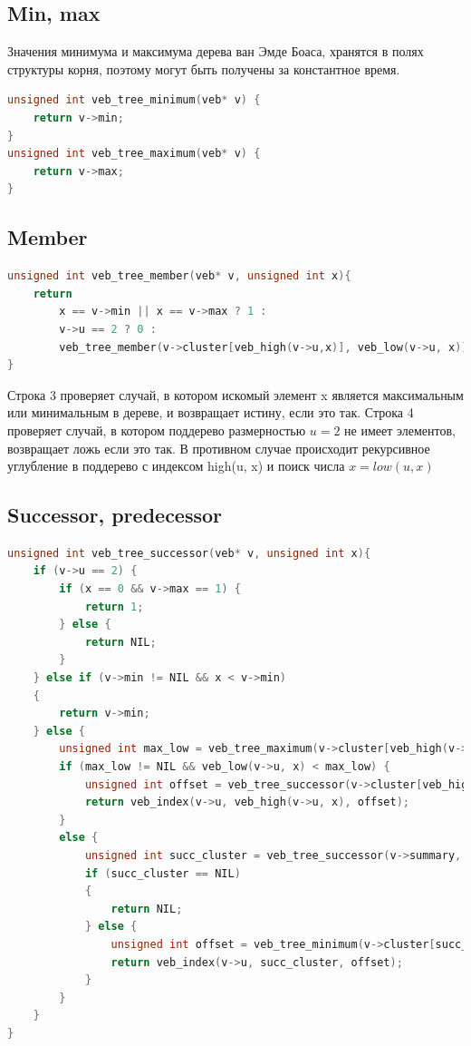 \documentclass{article}
\begin{document}
\subsection{Min, max}
Значения минимума и максимума дерева ван Эмде Боаса, хранятся в полях структуры корня, поэтому могут быть получены за константное время.
\begin{lstlisting}[language=C,style=C]
unsigned int veb_tree_minimum(veb* v) {
    return v->min;
}
unsigned int veb_tree_maximum(veb* v) {
    return v->max;
}
\end{lstlisting}
\subsection{Member}
\begin{lstlisting}[language=C,style=C]
unsigned int veb_tree_member(veb* v, unsigned int x){
    return
        x == v->min || x == v->max ? 1 :
        v->u == 2 ? 0 :
        veb_tree_member(v->cluster[veb_high(v->u,x)], veb_low(v->u, x));
}
\end{lstlisting}

Строка 3 проверяет случай, в котором искомый элемент x является максимальным или минимальным в дереве, и возвращает истину, если это так. Строка 4 проверяет случай, в котором поддерево размерностью $u=2$ не имеет элементов, возвращает ложь если это так. В противном случае происходит рекурсивное углубление в поддерево с индексом high(u, x) и поиск числа $x = low(u, x)$ \cite{ita}
\subsection{Successor, predecessor}
\begin{lstlisting}[language=C,style=C]
unsigned int veb_tree_successor(veb* v, unsigned int x){
    if (v->u == 2) {
        if (x == 0 && v->max == 1) {
            return 1;
        } else {
            return NIL;
        }
    } else if (v->min != NIL && x < v->min)
    {
        return v->min;
    } else {
        unsigned int max_low = veb_tree_maximum(v->cluster[veb_high(v->u,x)]);
        if (max_low != NIL && veb_low(v->u, x) < max_low) {
            unsigned int offset = veb_tree_successor(v->cluster[veb_high(v->u, x)], veb_low(v->u,x));
            return veb_index(v->u, veb_high(v->u, x), offset);
        }
        else {
            unsigned int succ_cluster = veb_tree_successor(v->summary, veb_high(v->u,x));
            if (succ_cluster == NIL)
            {
                return NIL;
            } else {
                unsigned int offset = veb_tree_minimum(v->cluster[succ_cluster]);
                return veb_index(v->u, succ_cluster, offset);
            }
        }
    }
}
\end{lstlisting}
\end{document}
